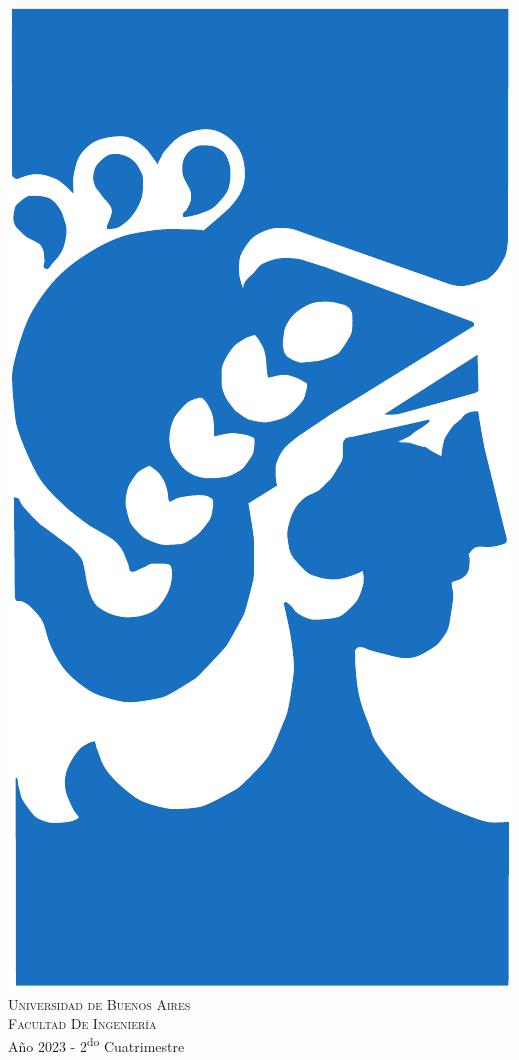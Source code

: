 \begin{titlepage}

    \thispagestyle{empty}
    
    \begin{center}
    \includegraphics[scale=0.3]{imagenes/fiuba.pdf}\\
    \large{\textsc{Universidad de Buenos Aires}}\\
    \large{\textsc{Facultad De Ingeniería}}\\
    \small{Año 2023 - 2\textsuperscript{do} Cuatrimestre}
    \end{center}
    

\end{titlepage}

